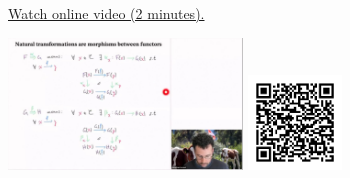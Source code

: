 
\begin{minipage}{10cm}
    \href{https://act4e-spring21.netlify.app/videos/spring2021-nat-trafos:natural-trafos:nattrafos-as-mor.html}{Watch online video (2 minutes).}
        
    \href{https://act4e-spring21.netlify.app/videos/spring2021-nat-trafos:natural-trafos:nattrafos-as-mor.html}{\includegraphics[height=3.5cm]{spring2021-nat-trafos:natural-trafos:nattrafos-as-mor/thumbnails.jpg}}
    \href{https://act4e-spring21.netlify.app/videos/spring2021-nat-trafos:natural-trafos:nattrafos-as-mor.html}{\includegraphics[height=2.5cm]{spring2021-nat-trafos:natural-trafos:nattrafos-as-mor/qrcode.png}}
\end{minipage}
